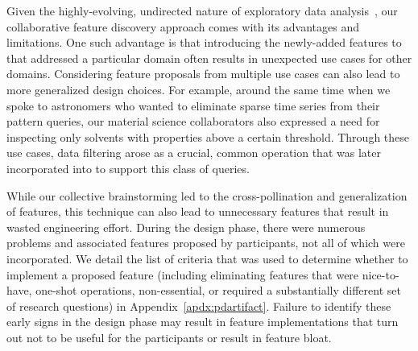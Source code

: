 {  \par Given the highly-evolving, undirected nature of exploratory data analysis~\cite{Keim2006,Tukey1970}, our collaborative feature discovery approach comes with its advantages and limitations. One such advantage is that introducing the newly-added features to \zvpp that addressed a particular domain often results in unexpected use cases for other domains. Considering feature proposals from multiple use cases can also lead to more generalized design choices. For example, around the same time when we spoke to astronomers who wanted to eliminate sparse time series from their pattern queries, our material science collaborators also expressed a need for inspecting only solvents with properties above a certain threshold. Through these use cases, data filtering arose as a crucial, common operation that was later incorporated into \zvpp to support this class of queries. %
  
  \par While our collective brainstorming led to the cross-pollination and generalization of features, this technique can also lead to unnecessary features that result in wasted engineering effort. During the design phase, there were numerous problems and associated features proposed by participants, not all of which were incorporated. We detail the list of criteria that was used to determine whether to implement a proposed feature (including eliminating features that were nice-to-have, one-shot operations, non-essential, or required a substantially different set of research questions) in Appendix~\ref{apdx:pdartifact}. Failure to identify these early signs in the design phase may result in feature implementations that turn out not to be useful for the participants or result in feature bloat.
}
